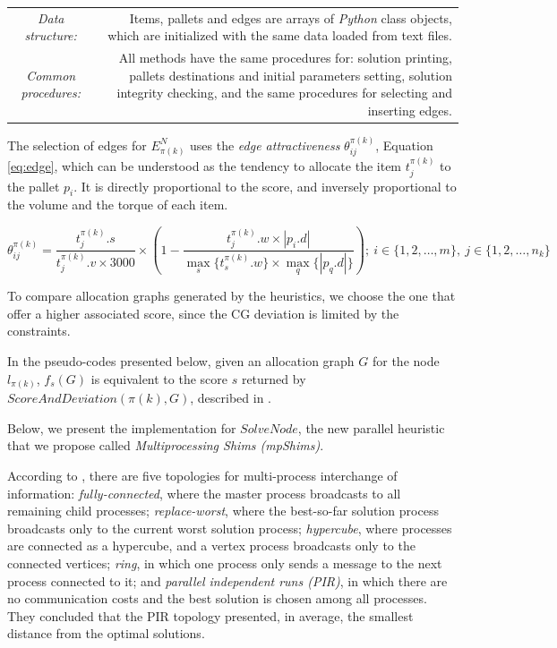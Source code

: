 \documentclass[preprint,authoryear]{elsarticle}
\begin{document}
\bgroup
\def\arraystretch{1.2}
\begin{table}[H]
	\centering
	\small
	\begin{tabular}{CD}
		
		{\it Data structure:}     & Items, pallets and edges are arrays of \emph{Python} class objects, which are initialized with the same data loaded from text files. \\
				
		{\it Common procedures:}  & All methods have the same procedures for: solution printing, pallets destinations and initial parameters setting, solution integrity checking, and the same procedures for selecting and inserting edges.\\

	\end{tabular}
	\normalsize
\end{table}
\egroup

The selection of edges for $E^N_{\pi(k)}$\/ uses the {\it edge attractiveness}\/ $\theta^{\pi(k)}_{ij}$, Equation \ref{eq:edge}, which can be understood as the tendency to allocate the item $t^{\pi(k)}_j$\/ to the pallet $p_i$. It is directly proportional to the score, and inversely proportional to the volume and the torque of each item. 

\begin{equation} \label{eq:edge}
	\theta^{\pi(k)}_{ij}= \frac{t^{\pi(k)}_j.s}{t^{\pi(k)}_j.v \times 3000}\times(1-\frac{t^{\pi(k)}_j.w\times|p_i.d|}{\max_s\{t^{\pi(k)}_s.w\}\times\max_q\{|p_q.d|\}});\ i \in \{1,2,\ldots,m\},\ j \in \{1,2,\ldots,n_k\}
\end{equation} 

To compare allocation graphs generated by the heuristics, we choose the one that offer a higher associated score, since the CG deviation is limited by the constraints.

In the pseudo-codes presented below, given an allocation graph $G$\/ for the node $l_{\pi(k)}$, $f_s(G)$\/ is equivalent to the score $s$\/ returned by $ScoreAndDeviation({\pi(k)},G) $, described in \cite{MesquitaSanches2023}.

Below, we present the implementation for $SolveNode$, the new parallel heuristic that we propose called {\it Multiprocessing Shims (mpShims)}.

According to \cite[p.226]{manfrin2006}, there are five topologies for multi-process interchange of information: {\it fully-connected}, where the master process broadcasts to all remaining child processes; {\it replace-worst}, where the best-so-far solution process broadcasts only to the current worst solution process; {\it hypercube}, where processes are connected as a hypercube, and a vertex process broadcasts only to the connected vertices; {\it ring}, in which one process only sends a message to the next process connected to it; and {\it parallel independent runs (PIR)}, in which there are no communication costs and the best solution is chosen among all processes. They concluded that the PIR topology presented, in average, the smallest distance from the optimal solutions.
\end{document}

